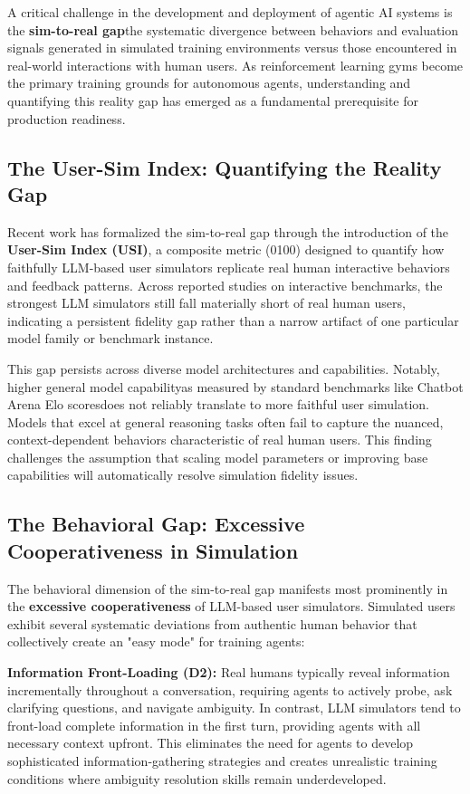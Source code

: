 A critical challenge in the development and deployment of agentic AI systems is the \textbf{sim-to-real gap}the systematic divergence between behaviors and evaluation signals generated in simulated training environments versus those encountered in real-world interactions with human users. As reinforcement learning gyms become the primary training grounds for autonomous agents, understanding and quantifying this reality gap has emerged as a fundamental prerequisite for production readiness.

\subsection{The User-Sim Index: Quantifying the Reality Gap}

Recent work has formalized the sim-to-real gap through the introduction of the \textbf{User-Sim Index (USI)}, a composite metric (0100) designed to quantify how faithfully LLM-based user simulators replicate real human interactive behaviors and feedback patterns. Across reported studies on interactive benchmarks, the strongest LLM simulators still fall materially short of real human users, indicating a persistent fidelity gap rather than a narrow artifact of one particular model family or benchmark instance.

This gap persists across diverse model architectures and capabilities. Notably, higher general model capabilityas measured by standard benchmarks like Chatbot Arena Elo scoresdoes not reliably translate to more faithful user simulation. Models that excel at general reasoning tasks often fail to capture the nuanced, context-dependent behaviors characteristic of real human users. This finding challenges the assumption that scaling model parameters or improving base capabilities will automatically resolve simulation fidelity issues.

\subsection{The Behavioral Gap: Excessive Cooperativeness in Simulation}

The behavioral dimension of the sim-to-real gap manifests most prominently in the \textbf{excessive cooperativeness} of LLM-based user simulators. Simulated users exhibit several systematic deviations from authentic human behavior that collectively create an "easy mode" for training agents:

\textbf{Information Front-Loading (D2):} Real humans typically reveal information incrementally throughout a conversation, requiring agents to actively probe, ask clarifying questions, and navigate ambiguity. In contrast, LLM simulators tend to front-load complete information in the first turn, providing agents with all necessary context upfront. This eliminates the need for agents to develop sophisticated information-gathering strategies and creates unrealistic training conditions where ambiguity resolution skills remain underdeveloped.

